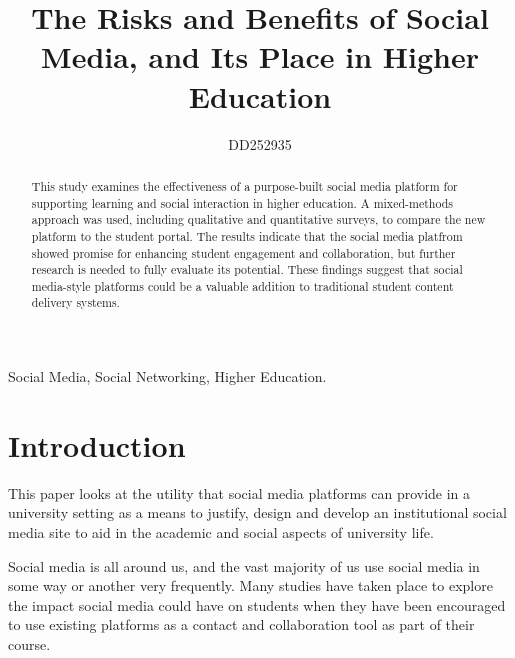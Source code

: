 \documentclass[lettersize,journal]{IEEEtran}
\begin{document}
\title{The Risks and Benefits of Social Media, and Its Place in Higher Education}

\author{DD252935}




\maketitle

\begin{abstract}
	This study examines the effectiveness of a purpose-built social media platform for supporting learning and social interaction in higher education. A mixed-methods
	approach was used, including qualitative and quantitative surveys, to compare the new platform to the student portal. The results indicate that the social media
	platfrom showed promise for enhancing student engagement and collaboration, but further research is needed to fully evaluate its potential. These findings suggest 
	that social media-style platforms could be a valuable addition to traditional student content delivery systems.


        \end{abstract}

\begin{IEEEkeywords}
Social Media, Social Networking, Higher Education.
\end{IEEEkeywords}

\section{Introduction}


    This paper looks at the utility that social media platforms can provide in a university setting as a means to justify, design and develop an institutional social media site to aid in the 
    academic and social aspects of university life.


    Social media is all around us, and the vast majority of us use social media in some way or another very
    frequently. Many studies have taken place to explore the impact social media could have on students
    when they have been encouraged to use existing platforms as a contact and collaboration tool as part
    of their course.
\end{document}
